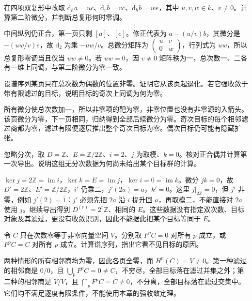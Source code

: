 \begin{exercise}\label{b4:ex:14-four-term-parameters}
	在四项双复形中改取 \(\mathrm{d}_ha=u c\)、\(\mathrm{d}_vb=v c\)、\(\mathrm{d}_hb=w e\)，其中 \(u,v,w\in k\)、\(v\ne0\)。计算第二阶微分，并判断总复形何时零调。
\end{exercise}
\begin{solution}
	中间纵列仍正合，第一页只剩 \([a]\)、\([e]\)。修正代表为 \(a-(u/v)b\)，其微分是 \(-(uw/v)e\)，故 \(\mathrm{d}_2\) 为乘 \(-uw/v\)。总微分矩阵为 \(\left(\begin{smallmatrix}u&v\\0&w\end{smallmatrix}\right)\)，行列式为 \(uw\)，所以总复形零调当且仅当 \(uw\ne0\)。若 \(uw=0\)，因 \(v\ne0\) 矩阵秩为一，总次数一、二各有一维上同调，与第二阶微分为零一致。
\end{solution}

\begin{exercise}\label{b4:ex:14-parity-degeneration}
	设谱序列某页只在总次数为偶数的位置非零。证明它从该页起退化。若它强收敛于带有限滤过的目标，说明目标的奇次上同调为何为零。
\end{exercise}
\begin{solution}
	所有微分使总次数加一，所以非零项的靶为零，非零位置也没有非零源的入箭头。该页微分为零，下一页相同，归纳得到全部后续微分为零。奇次目标的每个相邻滤过商都为零，滤过有限便逐层推出整个奇次目标为零。偶次目标仍可能有隐藏扩张。
\end{solution}

\begin{exercise}\label{b4:ex:14-exact-couple-integer}
	忽略分次，取 \(D=\mathbb Z\)、\(E=\mathbb Z/2\mathbb Z\)、\(i=2\)、\(j\) 为取模、\(k=0\)。核对正合偶并计算第一次导出。说明这组无分次数据为何尚未给出某个目标群的计算。
\end{exercise}
\begin{solution}
	\(\ker j=2\mathbb Z=\operatorname{im}i\)，\(\ker k=E=\operatorname{im}j\)，\(\ker i=0=\operatorname{im}k\)。微分 \(jk=0\)，故 \(D'=2\mathbb Z\)、\(E'=\mathbb Z/2\mathbb Z\)，\(i'\) 仍乘二，\(j'(2a)=\overline a\)，\(k'=0\)。这里 \(j|_{2\mathbb Z}=0\)，但 \(j'\) 非零，例如 \(j'(2)=\overline1\)：\(j'\) 必须先把 \(2a\) 沿 \(i\) 提升回 \(a\)，再取模二，不能直接对 \(2a\) 使用 \(j\)。继续导出得到 \(D^{(r)}=2^r\mathbb Z\)、相同的 \(E\)。这些数据没有指定双次数、目标对象及其滤过，更没有收敛识别，因此不能据此把某个目标等同于 \(E\)。
\end{solution}

\begin{exercise}\label{b4:ex:14-exhaustive-separated}
	令 \(C\) 只在次数零等于非零向量空间 \(V\)。分别取 \(F^pC=0\) 对所有 \(p\) 成立，或 \(F^pC=C\) 对所有 \(p\) 成立。计算谱序列，指出它看不见目标的原因。
\end{exercise}
\begin{solution}
	两种情形的所有相邻商均为零，因此各页全零，而 \(H^0(C)=V\ne0\)。第一种滤过的相邻商是 \(0/0\)，且 \(\bigcup_pF^pC=0\ne C\)，不穷尽，全部目标落在滤过并集之外；第二种的相邻商是 \(V/V\)，且 \(\bigcap_pF^pC=C\ne0\)，不分离，全部目标落在滤过交集中。它们均不满足逐度有限条件，不能使用本章的强收敛定理。
\end{solution}

